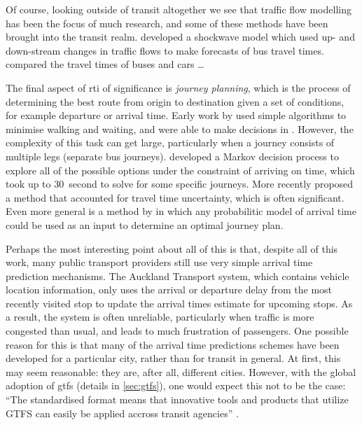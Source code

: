 Of course, looking outside of transit altogether we see that traffic flow modelling has been the focus of much research, and some of these methods have been brought into the transit realm. \citet{Julio_2016} developed a shockwave model which used up- and down-stream changes in traffic flows to make forecasts of bus travel times. \citet{Salonen_2013} compared the travel times of buses and cars \ldots


The final aspect of \gls{rti} of significance is \emph{journey planning}, which is the process of determining the best route from origin to destination given a set of conditions, for example departure or arrival time. Early work by \citet{Horn_2004} used simple algorithms to minimise walking and waiting, and were able to make decisions in \rt{}. However, the complexity of this task can get large, particularly when a journey consists of multiple legs (separate bus journeys). \citet{Hame_2013a} developed a Markov decision process to explore all of the possible options under the constraint of arriving on time, which took up to 30~second to solve for some specific journeys. More recently \citet{Zheng_2016} proposed a method that accounted for travel time uncertainty, which is often significant. Even more general is a method by \citet{Berczi_2017} in which any probabilitic model of arrival time could be used as an input to determine an optimal journey plan.


Perhaps the most interesting point about all of this is that, despite all of this work, many public transport providers still use very simple arrival time prediction mechanisms. The Auckland Transport system, which contains \rt{} vehicle location information, only uses the arrival or departure delay from the most recently visited stop to update the arrival times estimate for upcoming stops. As a result, the system is often unreliable, particularly when traffic is more congested than usual, and leads to much frustration of passengers. One possible reason for this is that many of the arrival time predictions schemes have been developed for a particular city, rather than for transit in general. At first, this may seem reasonable: they are, after all, different cities. However, with the global adoption of \gls{gtfs} (details in \cref{sec:gtfs}), one would expect this not to be the case: ``The standardised format means that innovative tools and products that utilize GTFS can easily be applied accross transit agencies'' \citep[26]{TCRP_2020}.


